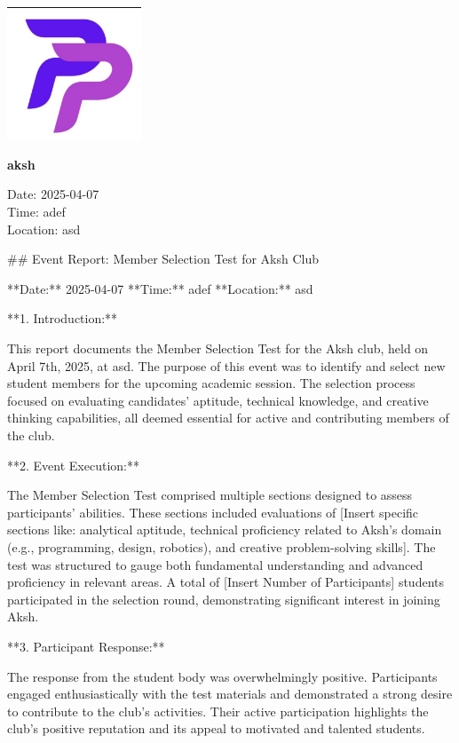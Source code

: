 \documentclass{article}
\begin{document}
\begin{center}
    \includegraphics[width=0.3\textwidth]{logo.png}
    \vspace{0.5cm}

   \LARGE \textbf{aksh}

    \vspace{0.3cm}
    \normalsize Date: 2025-04-07 \\
    Time: adef \\
    Location: asd
\end{center}

\vspace{1cm}

\#\# Event Report: Member Selection Test for Aksh Club

**Date:** 2025-04-07
**Time:** adef
**Location:** asd

**1. Introduction:**

This report documents the Member Selection Test for the Aksh club, held on April 7th, 2025, at asd. The purpose of this event was to identify and select new student members for the upcoming academic session. The selection process focused on evaluating candidates' aptitude, technical knowledge, and creative thinking capabilities, all deemed essential for active and contributing members of the club.

**2. Event Execution:**

The Member Selection Test comprised multiple sections designed to assess participants’ abilities. These sections included evaluations of [Insert specific sections like: analytical aptitude, technical proficiency related to Aksh's domain (e.g., programming, design, robotics), and creative problem-solving skills]. The test was structured to gauge both fundamental understanding and advanced proficiency in relevant areas. A total of [Insert Number of Participants] students participated in the selection round, demonstrating significant interest in joining Aksh.

**3. Participant Response:**

The response from the student body was overwhelmingly positive. Participants engaged enthusiastically with the test materials and demonstrated a strong desire to contribute to the club's activities. Their active participation highlights the club's positive reputation and its appeal to motivated and talented students.
\end{document}
